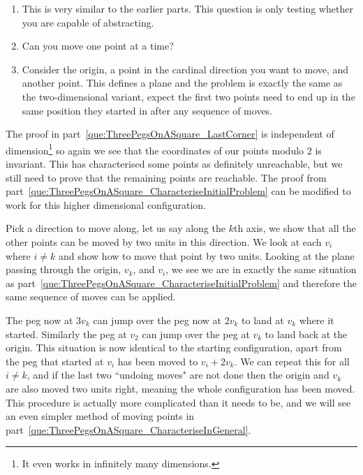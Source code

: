 \begin{parts}
	\begin{hints}
		\begin{enumerate}
			\item This is very similar to the earlier parts. This question is only testing whether you are capable of abstracting.
			\item Can you move one point at a time?
			\item Consider the origin, a point in the cardinal direction you want to move, and another point. This defines a plane and the problem is exactly the same as the two-dimensional variant, expect the first two points need to end up in the same position they started in after any sequence of moves.
		\end{enumerate}
	\end{hints}
	
	\begin{solution}
	
		The proof in part~\ref{que:ThreePegsOnASquare_LastCorner} is independent of dimension\footnote{It even works in infinitely many dimensions.} so again we see that the coordinates of our points modulo 2 is invariant. This has characterised some points as definitely unreachable, but we still need to prove that the remaining points are reachable. The proof from part~\ref{que:ThreePegsOnASquare_CharacteriseInitialProblem} can be modified to work for this higher dimensional configuration.
		
		Pick a direction to move along, let us say along the $k$th axis, we show that all the other points can be moved by two units in this direction. We look at each $v_i$ where $i \ne k$ and show how to move that point by two units. Looking at the plane passing through the origin, $v_k$, and $v_i$, we see we are in exactly the same situation as part~\ref{que:ThreePegsOnASquare_CharacteriseInitialProblem} and therefore the same sequence of moves can be applied.
		
		The peg now at $3v_k$ can jump over the peg now at $2v_k$ to land at $v_k$ where it started. Similarly the peg at $v_2$ can jump over the peg at $v_k$ to land back at the origin. This situation is now identical to the starting configuration, apart from the peg that started at $v_i$ has been moved to $v_i + 2v_k$. We can repeat this for all $i \ne k$, and if the last two ``undoing moves" are not done then the origin and $v_k$ are also moved two units right, meaning the whole configuration has been moved. This procedure is actually more complicated than it needs to be, and we will see an even simpler method of moving points in part~\ref{que:ThreePegsOnASquare_CharacteriseInGeneral}.
	

\end{solution}
\end{parts}
